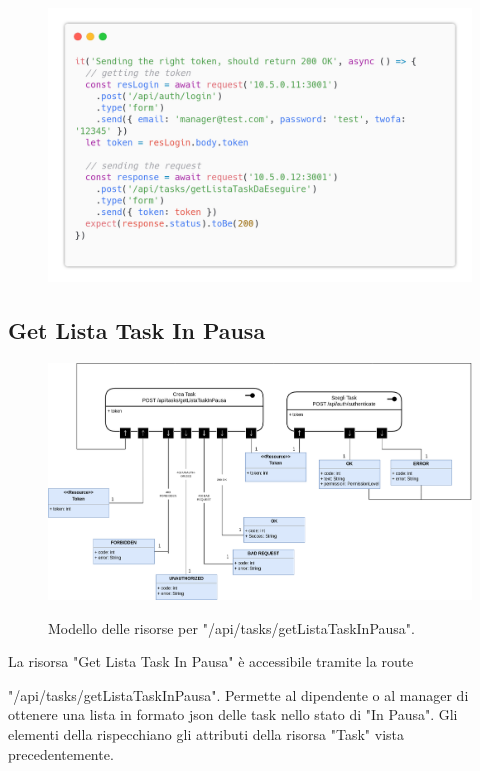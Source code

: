 \documentclass{report}
\begin{document}
\begin{figure}[H]
	\centering\includegraphics[width=1\textwidth]{images/code_da_eseguire_test4.png}
\end{figure}

\subsection*{Get Lista Task In Pausa}

\begin{figure}[H]
	\centering\includegraphics[width=1\textwidth]{images/model_in_pausa.png}
	
	Modello delle risorse per "/api/tasks/getListaTaskInPausa".
\end{figure}

La risorsa "Get Lista Task In Pausa" è accessibile tramite la route

"/api/tasks/getListaTaskInPausa". Permette al dipendente o al manager di ottenere una lista in formato json delle task nello stato di "In Pausa". Gli elementi della rispecchiano gli attributi della risorsa "Task" vista precedentemente.
\end{document}
